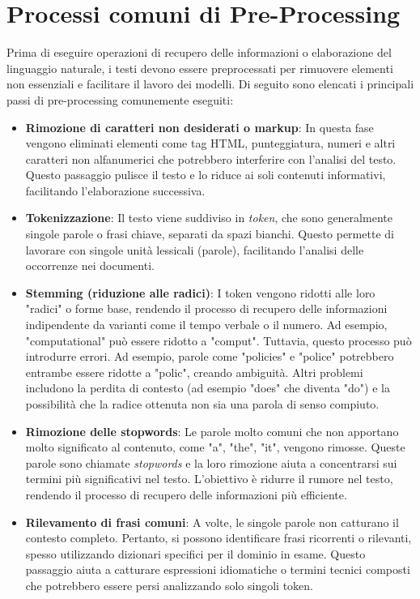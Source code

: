 \documentclass{report}
\begin{document}
	\section{Processi comuni di Pre-Processing}
	Prima di eseguire operazioni di recupero delle informazioni o elaborazione del linguaggio naturale, i testi devono essere preprocessati per rimuovere elementi non essenziali e facilitare il lavoro dei modelli. Di seguito sono elencati i principali passi di pre-processing comunemente eseguiti:

	\begin{itemize}
		\item \textbf{Rimozione di caratteri non desiderati o markup}: In questa fase vengono eliminati elementi come tag HTML, punteggiatura, numeri e altri caratteri non alfanumerici che potrebbero interferire con l'analisi del testo. Questo passaggio pulisce il testo e lo riduce ai soli contenuti informativi, facilitando l'elaborazione successiva.
		\item \textbf{Tokenizzazione}: Il testo viene suddiviso in \emph{token}, che sono generalmente singole parole o frasi chiave, separati da spazi bianchi. Questo permette di lavorare con singole unità lessicali (parole), facilitando l'analisi delle occorrenze nei documenti.
		\item \textbf{Stemming (riduzione alle radici)}: I token vengono ridotti alle loro "radici" o forme base, rendendo il processo di recupero delle informazioni indipendente da varianti come il tempo verbale o il numero. Ad esempio, "computational" può essere ridotto a "comput". Tuttavia, questo processo può introdurre errori. Ad esempio, parole come "policies" e "police" potrebbero entrambe essere ridotte a "polic", creando ambiguità. Altri problemi includono la perdita di contesto (ad esempio "does" che diventa "do") e la possibilità che la radice ottenuta non sia una parola di senso compiuto.
		\item \textbf{Rimozione delle stopwords}: Le parole molto comuni che non apportano molto significato al contenuto, come "a", "the", "it", vengono rimosse. Queste parole sono chiamate \emph{stopwords} e la loro rimozione aiuta a concentrarsi sui termini più significativi nel testo. L'obiettivo è ridurre il rumore nel testo, rendendo il processo di recupero delle informazioni più efficiente.
		\item \textbf{Rilevamento di frasi comuni}: A volte, le singole parole non catturano il contesto completo. Pertanto, si possono identificare frasi ricorrenti o rilevanti, spesso utilizzando dizionari specifici per il dominio in esame. Questo passaggio aiuta a catturare espressioni idiomatiche o termini tecnici composti che potrebbero essere persi analizzando solo singoli token.

\end{itemize}
\end{document}
